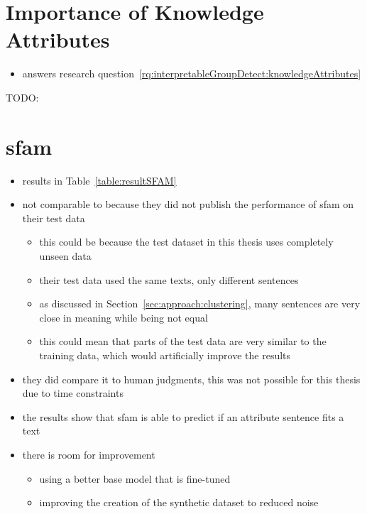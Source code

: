 \section{Importance of Knowledge Attributes}
\begin{itemize}
  \item answers research question~\ref{rq:interpretableGroupDetect:knowledgeAttributes}
\end{itemize}
\begin{table}[ht]
  \resultKnowledgeImportance{}
  \label{table:knowledgeImportance}
  \caption{TODO:}
\end{table}


\section{\acs{sfam}}
\begin{itemize}
  \item results in Table~\ref{table:resultSFAM}
  \item not comparable to \citet{patelLearningInterpretableStyle2023} because they did not publish the performance of \ac{sfam} on their test data
        \begin{itemize}
          \item this could be because the test dataset in this thesis uses completely unseen data
          \item their test data used the same texts, only different sentences
          \item as discussed in Section~\ref{sec:approach:clustering}, many sentences are very close in meaning while being not equal
          \item this could mean that parts of the test data are very similar to the training data, which would artificially improve the results
        \end{itemize}
  \item they did compare it to human judgments, this was not possible for this thesis due to time constraints
  \item the results show that \ac{sfam} is able to predict if an attribute sentence fits a text
  \item there is room for improvement
        \begin{itemize}
          \item using a better base model that is fine-tuned
          \item improving the creation of the synthetic dataset to reduced noise
        \end{itemize}
\end{itemize}

